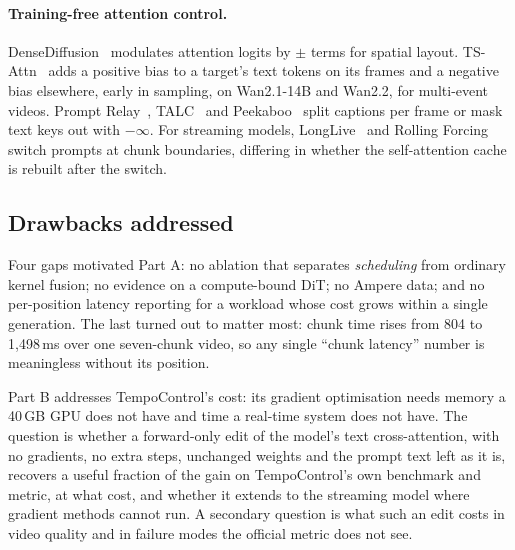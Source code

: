\documentclass[10pt,a4paper]{article}
\begin{document}
\paragraph{Training-free attention control.} DenseDiffusion~\cite{densediffusion} modulates attention logits by $\pm$ terms for spatial layout. TS-Attn~\cite{tsattn} adds a positive bias to a target's text tokens on its frames and a negative bias elsewhere, early in sampling, on Wan2.1-14B and Wan2.2, for multi-event videos. Prompt Relay~\cite{promptrelay}, TALC~\cite{talc} and Peekaboo~\cite{peekaboo} split captions per frame or mask text keys out with $-\infty$. For streaming models, LongLive~\cite{longlive} and Rolling Forcing~\cite{rollingforcing} switch prompts at chunk boundaries, differing in whether the self-attention cache is rebuilt after the switch.

\subsection{Drawbacks addressed}
Four gaps motivated Part A: no ablation that separates \emph{scheduling} from ordinary kernel fusion; no evidence on a compute-bound DiT; no Ampere data; and no per-position latency reporting for a workload whose cost grows within a single generation. The last turned out to matter most: chunk time rises from 804 to 1{,}498\,ms over one seven-chunk video, so any single ``chunk latency'' number is meaningless without its position.

Part B addresses TempoControl's cost: its gradient optimisation needs memory a 40\,GB GPU does not have and time a real-time system does not have. The question is whether a forward-only edit of the model's text cross-attention, with no gradients, no extra steps, unchanged weights and the prompt text left as it is, recovers a useful fraction of the gain on TempoControl's own benchmark and metric, at what cost, and whether it extends to the streaming model where gradient methods cannot run. A secondary question is what such an edit costs in video quality and in failure modes the official metric does not see.
\end{document}
